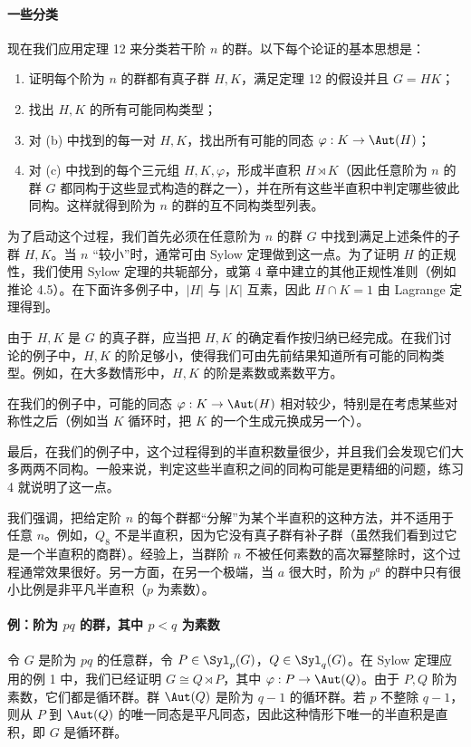 \paragraph{一些分类}
现在我们应用定理 12 来分类若干阶 $n$ 的群。以下每个论证的基本思想是：
\begin{enumerate}[label=(\alph*)]
  \item 证明每个阶为 $n$ 的群都有真子群 $H,K$，满足定理 12 的假设并且 $G=HK$；
  \item 找出 $H,K$ 的所有可能同构类型；
  \item 对 (b) 中找到的每一对 $H,K$，找出所有可能的同态 $\varphi:K\to\Aut(H)$；
  \item 对 (c) 中找到的每个三元组 $H,K,\varphi$，形成半直积 $H\rtimes K$（因此任意阶为 $n$ 的群 $G$ 都同构于这些显式构造的群之一），并在所有这些半直积中判定哪些彼此同构。这样就得到阶为 $n$ 的群的互不同构类型列表。
\end{enumerate}
为了启动这个过程，我们首先必须在任意阶为 $n$ 的群 $G$ 中找到满足上述条件的子群 $H,K$。当 $n$ “较小”时，通常可由 Sylow 定理做到这一点。为了证明 $H$ 的正规性，我们使用 Sylow 定理的共轭部分，或第 4 章中建立的其他正规性准则（例如推论 4.5）。在下面许多例子中，$|H|$ 与 $|K|$ 互素，因此 $H\cap K=1$ 由 Lagrange 定理得到。

由于 $H,K$ 是 $G$ 的真子群，应当把 $H,K$ 的确定看作按归纳已经完成。在我们讨论的例子中，$H,K$ 的阶足够小，使得我们可由先前结果知道所有可能的同构类型。例如，在大多数情形中，$H,K$ 的阶是素数或素数平方。

在我们的例子中，可能的同态 $\varphi:K\to\Aut(H)$ 相对较少，特别是在考虑某些对称性之后（例如当 $K$ 循环时，把 $K$ 的一个生成元换成另一个）。

最后，在我们的例子中，这个过程得到的半直积数量很少，并且我们会发现它们大多两两不同构。一般来说，判定这些半直积之间的同构可能是更精细的问题，练习 4 就说明了这一点。

我们强调，把给定阶 $n$ 的每个群都“分解”为某个半直积的这种方法，并不适用于任意 $n$。例如，$Q_8$ 不是半直积，因为它没有真子群有补子群（虽然我们看到过它是一个半直积的商群）。经验上，当群阶 $n$ 不被任何素数的高次幂整除时，这个过程通常效果很好。另一方面，在另一个极端，当 $a$ 很大时，阶为 $p^a$ 的群中只有很小比例是非平凡半直积（$p$ 为素数）。

\paragraph{例：阶为 $pq$ 的群，其中 $p<q$ 为素数}
令 $G$ 是阶为 $pq$ 的任意群，令 $P\in\Syl_p(G)$，$Q\in\Syl_q(G)$。在 Sylow 定理应用的例 1 中，我们已经证明 $G\cong Q\rtimes P$，其中 $\varphi:P\to\Aut(Q)$。由于 $P,Q$ 阶为素数，它们都是循环群。群 $\Aut(Q)$ 是阶为 $q-1$ 的循环群。若 $p$ 不整除 $q-1$，则从 $P$ 到 $\Aut(Q)$ 的唯一同态是平凡同态，因此这种情形下唯一的半直积是直积，即 $G$ 是循环群。

